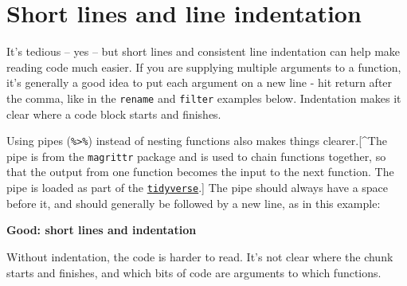 \documentclass[]{book}
\newenvironment{Shaded}{\begin{snugshade}}{\end{snugshade}}
\newcommand{\DataTypeTok}[1]{\textcolor[rgb]{0.13,0.29,0.53}{#1}}
\newcommand{\DecValTok}[1]{\textcolor[rgb]{0.00,0.00,0.81}{#1}}
\newcommand{\KeywordTok}[1]{\textcolor[rgb]{0.13,0.29,0.53}{\textbf{#1}}}
\newcommand{\NormalTok}[1]{#1}
\newcommand{\OperatorTok}[1]{\textcolor[rgb]{0.81,0.36,0.00}{\textbf{#1}}}
\newcommand{\OtherTok}[1]{\textcolor[rgb]{0.56,0.35,0.01}{#1}}
\newcommand{\StringTok}[1]{\textcolor[rgb]{0.31,0.60,0.02}{#1}}
\begin{document}
\hypertarget{short-lines-and-line-indentation}{%
\section{Short lines and line indentation}\label{short-lines-and-line-indentation}}

It's tedious -- yes -- but short lines and consistent line indentation can help make reading code much easier. If you are supplying multiple arguments to a function, it's generally a good idea to put each argument on a new line - hit return after the comma, like in the \texttt{rename} and \texttt{filter} examples below. Indentation makes it clear where a code block starts and finishes.

Using pipes (\texttt{\%\textgreater{}\%}) instead of nesting functions also makes things clearer.{[}\^{}The pipe is from the \texttt{magrittr} package and is used to chain functions together, so that the output from one function becomes the input to the next function. The pipe is loaded as part of the \protect\hyperlink{tidyverse}{\texttt{tidyverse}}.{]} The pipe should always have a space before it, and should generally be followed by a new line, as in this example:

\textbf{Good: short lines and indentation}

\begin{Shaded}
\end{Shaded}

Without indentation, the code is harder to read. It's not clear where the chunk starts and finishes, and which bits of code are arguments to which functions.
\end{document}

